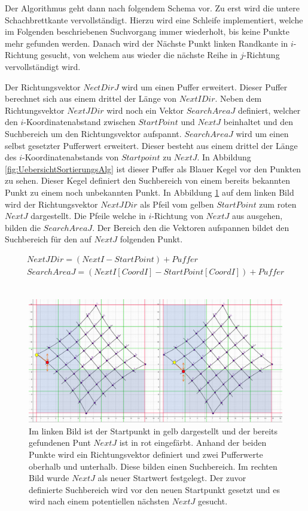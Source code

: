 Der Algorithmus geht dann nach folgendem Schema vor. Zu erst wird die untere Schachbrettkante vervollständigt. Hierzu wird eine Schleife implementiert, welche im Folgenden beschriebenen Suchvorgang immer wiederholt, bis keine Punkte mehr gefunden werden. Danach wird der Nächste Punkt linken Randkante in $i$-Richtung gesucht, von welchem aus wieder die nächste Reihe in $j$-Richtung vervollständigt wird. 

Der Richtungsvektor $NectDirJ$ wird um einen Puffer erweitert. Dieser Puffer berechnet sich aus einem drittel der Länge von $NextIDir$. Neben dem Richtungsvektor $NextJDir$ wird noch ein Vektor $SearchAreaJ$ definiert, welcher den $i$-Koordinatenabstand zwischen $StartPoint$ und $NextJ$ beinhaltet und den Suchbereich um den Richtungsvektor aufspannt. $SearchAreaJ$ wird um einen selbst gesetzter Pufferwert erweitert. Dieser besteht aus einem drittel der Länge des $i$-Koordinatenabstands von $Startpoint$ zu $NextJ$. In Abbildung \ref{fig:UebersichtSortierungsAlg} ist dieser Puffer als Blauer Kegel vor den Punkten zu sehen. Dieser Kegel definiert den Suchbereich von einem bereits bekannten Punkt zu einem noch unbekannten Punkt. In Abbildung \ref{fig:IListJList} auf dem linken Bild wird der Richtungsvektor $NextJDir$ als Pfeil vom gelben $StartPoint$ zum roten $NextJ$ dargestellt. Die Pfeile welche in $i$-Richtung von $NextJ$ aus ausgehen, bilden die $SearchAreaJ$. Der Bereich den die Vektoren aufspannen bildet den Suchbereich für den auf $NextJ$ folgenden Punkt.

\begin{gather*}
	NextJDir = (NextI - StartPoint) + Puffer\\
	SearchAreaJ = (NextI[CoordI]-StartPoint[CoordI]) + Puffer
\end{gather*}\\


\begin{figure}[!htb]
	\centering
	\includegraphics[width=0.8\linewidth]{images/VerzeichnetesSchachbrett_4.png}
	\caption[Suche nach $NextJ$]{Im linken Bild ist der Startpunkt in gelb dargestellt und der bereits gefundenen Punt $NextJ$ ist in rot eingefärbt. Anhand der beiden Punkte wird ein Richtungsvektor definiert und zwei Pufferwerte oberhalb und unterhalb. Diese bilden einen Suchbereich. Im rechten Bild wurde $NextJ$ als neuer Startwert festgelegt. Der zuvor definierte Suchbereich wird vor den neuen Startpunkt gesetzt und es wird nach einem potentiellen nächsten $NextJ$ gesucht.}
	\label{fig:IListJList}
\end{figure}

